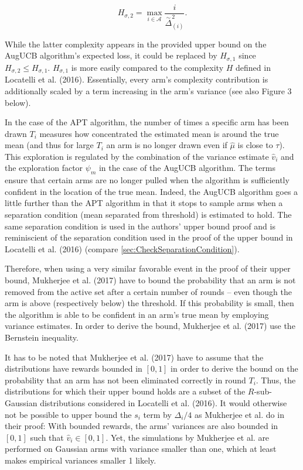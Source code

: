 \documentclass[11pt,]{article}
\begin{document}
\begin{equation*}
H_{\sigma,2} = \max_{i \in \mathcal{A}} \frac{i}{\stackrel{\sim}{\Delta}_{(i)}^2}.
\end{equation*}

While the latter complexity appears in the provided upper bound on the
AugUCB algorithm's expected loss, it could be replaced by
\(H_{\sigma, 1}\) since \(H_{\sigma, 2} \leq H_{\sigma,1}\).
\(H_{\sigma,1}\) is more easily compared to the complexity \(H\) defined
in Locatelli et al. (2016). Essentially, every arm's complexity
contribution is additionally scaled by a term increasing in the arm's
variance (see also Figure 3 below).

In the case of the APT algorithm, the number of times a specific arm has
been drawn \(T_i\) measures how concentrated the estimated mean is
around the true mean (and thus for large \(T_i\) an arm is no longer
drawn even if \(\hat{\mu}\) is close to \(\tau\)). This exploration is
regulated by the combination of the variance estimate \(\hat{v}_i\) and
the exploration factor \(\psi_m\) in the case of the AugUCB algorithm.
The terms ensure that certain arms are no longer pulled when the
algorithm is sufficiently confident in the location of the true mean.
Indeed, the AugUCB algorithm goes a little further than the APT
algorithm in that it stops to sample arms when a separation condition
(mean separated from threshold) is estimated to hold. The same
separation condition is used in the authors' upper bound proof and is
reminiscient of the separation condition used in the proof of the upper
bound in Locatelli et al. (2016) (compare
\autoref{sec:CheckSeparationCondition}).

Therefore, when using a very similar favorable event in the proof of
their upper bound, Mukherjee et al. (2017) have to bound the probability
that an arm is not removed from the active set after a certain number of
rounds -- even though the arm is above (respectively below) the
threshold. If this probability is small, then the algorithm is able to
be confident in an arm's true mean by employing variance estimates. In
order to derive the bound, Mukherjee et al. (2017) use the Bernstein
inequality.

It has to be noted that Mukherjee et al. (2017) have to assume that the
distributions have rewards bounded in \([0,1]\) in order to derive the
bound on the probability that an arm has not been eliminated correctly
in round \(T_i\). Thus, the distributions for which their upper bound
holds are a subset of the \(R\)-sub-Gaussian distributions considered in
Locatelli et al. (2016). It would otherwise not be possible to upper
bound the \(s_i\) term by \(\Delta_i/4\) as Mukherjee et al. do in their
proof: With bounded rewards, the arms' variances are also bounded in
\([0,1]\) such that \(\hat{v}_i \in [0,1]\). Yet, the simulations by
Mukherjee et al. are performed on Gaussian arms with variance smaller
than one, which at least makes empirical variances smaller 1 likely.
\end{document}
